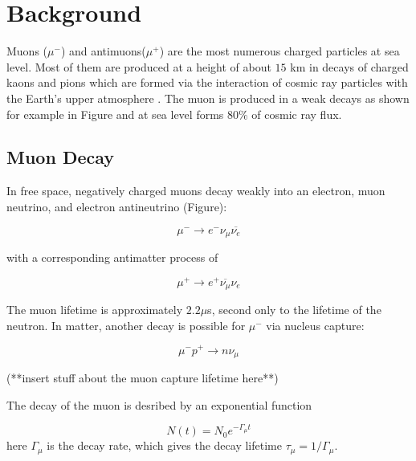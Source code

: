 
\section{Background}

Muons ($\mu^-$) and antimuons($\mu^+$) are the most numerous charged
particles at sea level\cite{pdg}. Most of them are produced at a
height of about $15$ km in decays of charged kaons and pions which are
formed via the interaction of cosmic ray particles with the Earth's
upper atmosphere \cite{amsler}. The muon is produced in a weak decays
as shown for example in Figure and at sea level forms $80\%$ of cosmic
ray flux.

\subsection{Muon Decay}

In free space, negatively charged muons decay weakly into an electron,
muon neutrino, and electron antineutrino \cite{easwar} (Figure):

\begin{equation}\mu^- \rightarrow e^- \nu_{\mu}\overline{\nu_e}\label{mudecay}\end{equation}

with a corresponding antimatter process of

\begin{equation}\mu^+ \rightarrow e^+ \overline{\nu_{\mu}}{\nu_e}\label{antimudecay}\end{equation}

The muon lifetime is approximately $2.2 \mu$s\cite{easwar}, second
only to the lifetime of the neutron. In matter, another decay is
possible for $\mu^-$ via nucleus capture:

\begin{equation}\mu^-p^+ \rightarrow n \nu_{\mu} \label{pcap} \end{equation}

(**insert stuff about the muon capture lifetime here**)

The decay of the muon is desribed by an exponential function

\begin{equation} N(t) = N_0 e^{-\Gamma_{\mu} t} \label{expdecay}\end{equation} 
here $\Gamma_{\mu}$ is the decay rate, which gives the decay lifetime
$\tau_{\mu} = 1/\Gamma_{\mu}$.

